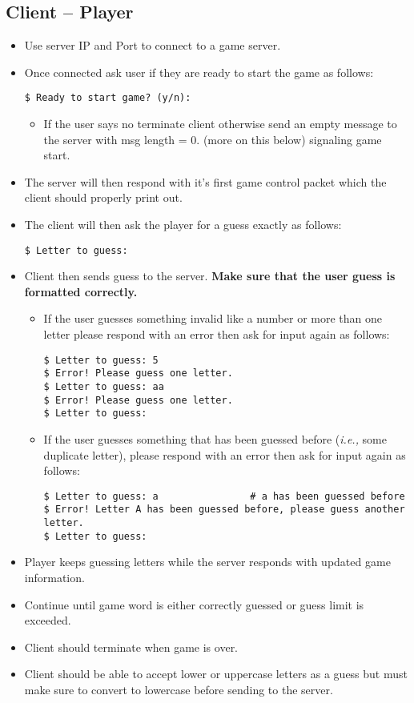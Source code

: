 \documentclass[12pt]{article}
\begin{document}
\subsection{Client -- Player}\label{subsec:client--Player}
\begin{itemize}
\item Use server IP and Port to connect to a game server.
\item Once connected ask user if they are ready to start the game as follows:
\begin{verbatim}
$ Ready to start game? (y/n): 
\end{verbatim}
\begin{itemize}
\item If the user says no terminate client otherwise send an empty message to the
server with msg length = 0. (more on this below) signaling game start.
\end{itemize}
\item The server will then respond with it’s first game control packet which the client should
properly print out.
\item The client will then ask the player for a guess exactly as follows:
\begin{verbatim}
$ Letter to guess:  
\end{verbatim}
\item Client then sends guess to the server.
{\bf Make sure that the user guess is formatted correctly.}
\begin{itemize}
\item If the user guesses something invalid like a number or more than one letter
please respond with an error then ask for input again as follows:
\begin{verbatim}
$ Letter to guess: 5
$ Error! Please guess one letter.
$ Letter to guess: aa
$ Error! Please guess one letter.
$ Letter to guess:
\end{verbatim}
\item If the user guesses something that has been guessed before ({\it i.e.,} some duplicate letter), please respond with an error then ask for input again as follows:
\begin{verbatim}
$ Letter to guess: a                # a has been guessed before
$ Error! Letter A has been guessed before, please guess another letter.
$ Letter to guess:
\end{verbatim}
\end{itemize}
\item Player keeps guessing letters while the server responds with updated game information.
\item Continue until game word is either correctly guessed or guess limit is exceeded.
\item Client should terminate when game is over.
\item Client should be able to accept lower or uppercase letters as a guess but must make
sure to convert to lowercase before sending to the server.
\end{itemize}
\end{document}
